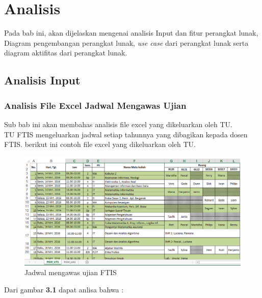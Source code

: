 \chapter{Analisis}
\label{chap:analysis}
Pada bab ini, akan dijelaskan mengenai analisis Input dan fitur perangkat lunak, Diagram pengembangan perangkat lunak, \textit{use case} dari perangkat lunak serta diagram aktifitas dari perangkat lunak.
\section{Analisis Input}
\subsection{Analisis File Excel Jadwal Mengawas Ujian}
Sub bab ini akan membahas analisis file excel yang dikeluarkan oleh TU.\\
TU FTIS mengeluarkan jadwal setiap tahunnya yang dibagikan kepada dosen FTIS. 
berikut ini contoh file excel yang dikeluarkan oleh TU. 
\begin{figure}[H]
	\centering
	\includegraphics[scale=0.5]{Gambar/scJadwal}
	\caption{Jadwal mengawas ujian FTIS}
	\end{figure}
Dari gambar \textbf{3.1} dapat anlisa bahwa :
